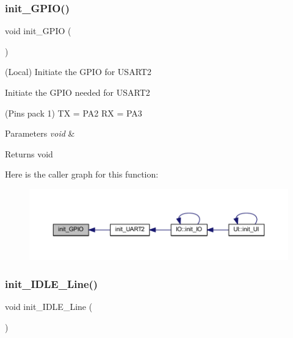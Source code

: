\subsubsection{\texorpdfstring{init\+\_\+\+G\+P\+I\+O()}{init\_GPIO()}}
{\footnotesize\ttfamily void init\+\_\+\+G\+P\+IO (\begin{DoxyParamCaption}\item[{void}]{ }\end{DoxyParamCaption})}



(Local) Initiate the G\+P\+IO for U\+S\+A\+R\+T2 

Initiate the G\+P\+IO needed for U\+S\+A\+R\+T2

(Pins pack 1) TX = P\+A2 RX = P\+A3


\begin{DoxyParams}{Parameters}
{\em void} & \\
\hline
\end{DoxyParams}
\begin{DoxyReturn}{Returns}
void 
\end{DoxyReturn}
Here is the caller graph for this function\+:\nopagebreak
\begin{figure}[H]
\begin{center}
\leavevmode
\includegraphics[width=350pt]{namespace_u_a_r_t_a92da5727d9a24141d77c8acb1fc776d0_icgraph}
\end{center}
\end{figure}
\mbox{\label{namespace_u_a_r_t_aae0befbeb6fc7e852f7a200e9a9f4c7c}} 
\subsubsection{\texorpdfstring{init\+\_\+\+I\+D\+L\+E\+\_\+\+Line()}{init\_IDLE\_Line()}}
{\footnotesize\ttfamily void init\+\_\+\+I\+D\+L\+E\+\_\+\+Line (\begin{DoxyParamCaption}\item[{void}]{ }\end{DoxyParamCaption})}



